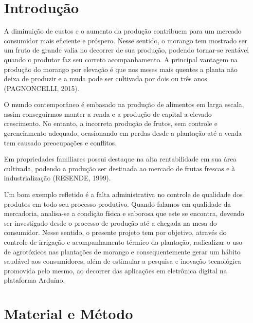 \documentclass[article,12pt,onesidea,4paper,english,brazil]{abntex2}
\begin{document}
	\textual
	
	\section*{Introdução}
	
	A diminuição de custos e o aumento da produção contribuem para um mercado consumidor mais eficiente e próspero. Nesse sentido, o morango tem mostrado ser um fruto de grande valia no decorrer de sua produção, podendo tornar-se rentável quando o produtor faz seu correto acompanhamento. A principal vantagem na produção do morango por elevação é que nos meses mais quentes a planta não deixa de produzir e a muda pode ser cultivada por dois ou três anos (PAGNONCELLI, 2015).
	
	O mundo contemporâneo é embasado na produção de alimentos em larga escala, assim conseguirmos manter a renda e a produção de capital a elevado crescimento. No entanto, a incorreta produção de frutos, sem controle e gerenciamento adequado, ocasionando em perdas desde a plantação até a venda tem causado preocupações e conflitos.
	
	Em propriedades familiares possui destaque na alta rentabilidade em sua área cultivada, podendo a produção ser destinada ao mercado de frutas frescas e à industrialização (RESENDE, 1999).
	
	Um bom exemplo refletido é a falta administrativa no controle de qualidade dos produtos em todo seu processo produtivo. Quando falamos em qualidade da mercadoria, analisa-se a condição física e saborosa que este se encontra, devendo ser investigado desde o processo de produção até a chegada na mesa do consumidor. Nesse sentido, o presente projeto tem por objetivo, através do controle de irrigação e acompanhamento térmico da plantação, radicalizar o uso de agrotóxicos nas plantações de morango e consequentemente gerar um hábito saudável aos consumidores, além de estimular a pesquisa e inovação tecnológica promovida pelo mesmo, ao decorrer das aplicações em eletrônica digital na plataforma Arduíno.
	
	\section*{Material e Método}
	
\end{document}
